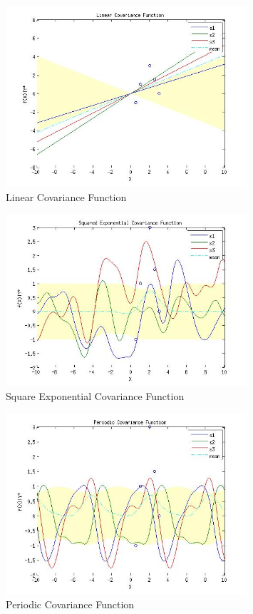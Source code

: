 \documentclass{article}
\begin{document}
\begin{enumerate}[label=(\alph*)]
\begin{figure}[H]
\centering
\includegraphics[width=0.8\textwidth]{1_e_1.jpg}
\caption{Linear Covariance Function}
\label{fig:1e1}
\end{figure}
\begin{figure}[H]
\centering
\includegraphics[width=0.8\textwidth]{1_e_2.jpg}
\caption{Square Exponential Covariance Function}
\label{fig:1e2}
\end{figure}
\begin{figure}[H]
\centering
\includegraphics[width=0.8\textwidth]{1_e_3.jpg}
\caption{Periodic Covariance Function}
\label{fig:1e3}
\end{figure}


\end{enumerate}
\end{document}

